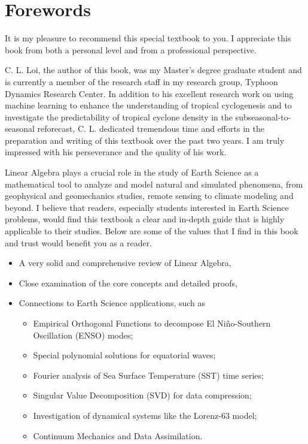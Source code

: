 \chapter*{Forewords}

It is my pleasure to recommend this special textbook to you. I appreciate this book from both a personal level and from a professional perspective.

C. L. Loi, the author of this book, was my Master's degree graduate student and is currently a member of the research staff in my research group, Typhoon Dynamics Research Center. In addition to his excellent research work on using machine learning to enhance the understanding of tropical cyclogenesis and to investigate the predictability of tropical cyclone density in the subseasonal-to-seasonal reforecast, C. L. dedicated tremendous time and efforts in the preparation and writing of this textbook over the past two years. I am truly impressed with his perseverance and the quality of his work.

Linear Algebra plays a crucial role in the study of Earth Science as a mathematical tool to analyze and model natural and simulated phenomena, from geophysical and geomechanics studies, remote sensing to climate modeling and beyond. I believe that readers, especially students interested in Earth Science problems, would find this textbook a clear and in-depth guide that is highly applicable to their studies. Below are some of the values that I find in this book and trust would benefit you as a reader.

\begin{itemize}
    \item A very solid and comprehensive review of Linear Algebra,
    \item Close examination of the core concepts and detailed proofs,
    \item Connections to Earth Science applications, such as 
    \begin{itemize}
        \item Empirical Orthogonal Functions to decompose El Niño-Southern Oscillation (ENSO) modes;
        \item Special polynomial solutions for equatorial waves;
        \item Fourier analysis of Sea Surface Temperature (SST) time series;
        \item Singular Value Decomposition (SVD) for data compression;
        \item Investigation of dynamical systems like the Lorenz-63 model;
        \item Continuum Mechanics and Data Assimilation.
    \end{itemize}
\end{itemize}

